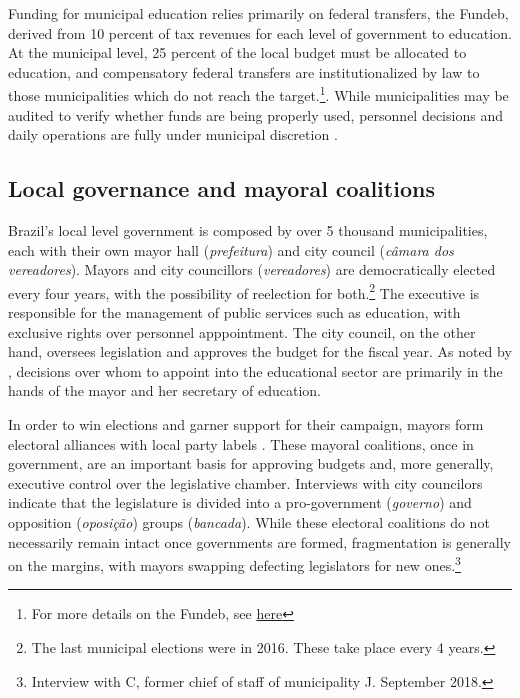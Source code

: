 \documentclass[12pt,a4paper]{article}
\begin{document}
Funding for municipal education relies primarily on federal transfers, the Fundeb, derived from 10 percent of tax revenues for each level of government to education. At the municipal level, 25 percent of the local budget must be allocated to education, and compensatory federal transfers are institutionalized by law to those municipalities which do not reach the target.\footnote{For more details on the Fundeb, see \hyperlink{https://www.fnde.gov.br/index.php/financiamento/fundeb/sobre-o-plano-ou-programa/sobre-o-fundeb}{here}}. While municipalities may be audited to verify whether funds are being properly used, personnel decisions and daily operations are fully under municipal discretion \citet{ferraz_corrupting_2012}.

\subsection{Local governance and mayoral coalitions}

Brazil's local level government is composed by over 5 thousand municipalities, each with their own mayor hall (\emph{prefeitura}) and city council (\emph{c\^{a}mara dos vereadores}). Mayors and city councillors (\textit{vereadores}) are democratically elected every four years, with the possibility of reelection for both.\footnote{The last municipal elections were in 2016. These take place every 4 years.} The executive is responsible for the management of public services such as education, with exclusive rights over personnel apppointment. The city council, on the other hand, oversees legislation and approves the budget for the fiscal year. As noted by \citet{souza_reforma_2004}, decisions over whom to appoint into the educational sector are primarily in the hands of the mayor and her secretary of education.

In order to win elections and garner support for their campaign, mayors form electoral alliances with local party labels \citet{dantas_eleicoes_2013}. These mayoral coalitions, once in government, are an important basis for approving budgets and, more generally, executive control over the legislative chamber. Interviews with city councilors indicate that the legislature is divided into a pro-government (\textit{governo}) and opposition (\textit{oposição}) groups (\textit{bancada}). While these electoral coalitions do not necessarily remain intact once governments are formed, fragmentation is generally on the margins, with mayors swapping defecting legislators for new ones.\footnote{Interview with C, former chief of staff of municipality J. September 2018.}
\end{document}
